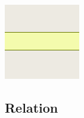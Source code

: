 \documentclass{beamer}
\begin{document}
\begin{frame}
\begin{center}
\begin{minipage}[b][0.6\textheight][c]{0.3\linewidth}
\begin{center}
					\includegraphics[width=0.3\linewidth,height=0.3\textheight,keepaspectratio]{images/Rendering-highway_secondary_neutral.png}\\
					\vspace{0.25cm}
				\end{center}
			\end{minipage}
		\end{center}
	\end{frame}
	
	\subsection{Relation}
	
\end{document}
